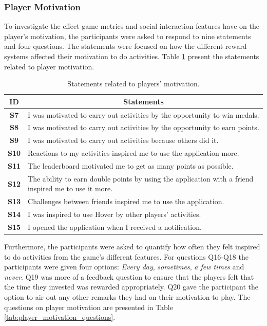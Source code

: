 \subsubsection{Player Motivation}
To investigate the effect game metrics and social interaction features have on the player’s motivation, the participants were asked to respond to nine statements and four questions. The statements were focused on how the different reward systems affected their motivation to do activities. Table \ref{tab:player_motivation_statements} present the statements related to player motivation.

\begin{table}[H]
    \centering
    \begin{tabularx}{0.95\textwidth}{|c|X|}
        \hline
        \textbf{ID} & \multicolumn{1}{c|}{\textbf{Statements}} \\ \hline
        \textbf{S7} & I was motivated to carry out activities by the opportunity to win medals. \\
        \textbf{S8} & I was motivated to carry out activities by the opportunity to earn points. \\
        \textbf{S9} & I was motivated to carry out activities because others did it. \\
        \textbf{S10} & Reactions to my activities inspired me to use the application more. \\
        \textbf{S11} & The leaderboard motivated me to get as many points as possible. \\
        \textbf{S12} & The ability to earn double points by using the application with a friend inspired me to use it more. \\
        \textbf{S13} & Challenges between friends inspired me to use the application. \\
        \textbf{S14} & I was inspired to use Hover by other players' activities. \\
        \textbf{S15} & I opened the application when I received a notification. \\ \hline
    \end{tabularx}
    \caption{Statements related to players' motivation.}
    \label{tab:player_motivation_statements}
\end{table}

Furthermore, the participants were asked to quantify how often they felt inspired to do activities from the game’s different features. For questions Q16-Q18 the participants were given four options: \textit{Every day}, \textit{sometimes}, \textit{a few times} and \textit{never}. Q19 was more of a feedback question to ensure that the players felt that the time they invested was rewarded appropriately. Q20 gave the participant the option to air out any other remarks they had on their motivation to play. The questions on player motivation are presented in Table \ref{tab:player_motivation_questions}.

